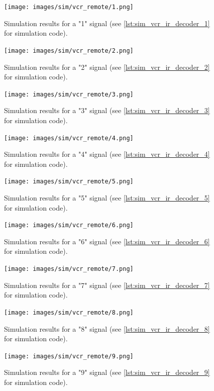 \documentclass[a4paper]{article}
\begin{document}
\begin{figure}[H]
	\centering
	\texttt{[image: images/sim/vcr\_remote/1.png]}
	\caption{Simulation results for a "1" signal (see \autoref{lst:sim_vcr_ir_decoder_1} for simulation code).}
\end{figure}

\begin{figure}[H]
	\centering
	\texttt{[image: images/sim/vcr\_remote/2.png]}
	\caption{Simulation results for a "2" signal (see \autoref{lst:sim_vcr_ir_decoder_2} for simulation code).}
\end{figure}

\begin{figure}[H]
	\centering
	\texttt{[image: images/sim/vcr\_remote/3.png]}
	\caption{Simulation results for a "3" signal (see \autoref{lst:sim_vcr_ir_decoder_3} for simulation code).}
\end{figure}

\begin{figure}[H]
	\centering
	\texttt{[image: images/sim/vcr\_remote/4.png]}
	\caption{Simulation results for a "4" signal (see \autoref{lst:sim_vcr_ir_decoder_4} for simulation code).}
\end{figure}

\begin{figure}[H]
	\centering
	\texttt{[image: images/sim/vcr\_remote/5.png]}
	\caption{Simulation results for a "5" signal (see \autoref{lst:sim_vcr_ir_decoder_5} for simulation code).}
\end{figure}

\begin{figure}[H]
	\centering
	\texttt{[image: images/sim/vcr\_remote/6.png]}
	\caption{Simulation results for a "6" signal (see \autoref{lst:sim_vcr_ir_decoder_6} for simulation code).}
\end{figure}

\begin{figure}[H]
	\centering
	\texttt{[image: images/sim/vcr\_remote/7.png]}
	\caption{Simulation results for a "7" signal (see \autoref{lst:sim_vcr_ir_decoder_7} for simulation code).}
\end{figure}

\begin{figure}[H]
	\centering
	\texttt{[image: images/sim/vcr\_remote/8.png]}
	\caption{Simulation results for a "8" signal (see \autoref{lst:sim_vcr_ir_decoder_8} for simulation code).}
\end{figure}

\begin{figure}[H]
	\centering
	\texttt{[image: images/sim/vcr\_remote/9.png]}
	\caption{Simulation results for a "9" signal (see \autoref{lst:sim_vcr_ir_decoder_9} for simulation code).}
\end{figure}
\end{document}
